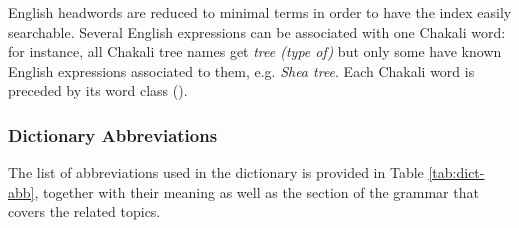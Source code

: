 \begin{table}[h]
\caption[]{Illustration of the English-Chakali reversal 
index entry\label{tab:illu-index}}
\begin{center} 
\end{center} 
\end{table}



English  headwords are reduced to 
minimal terms in order to have the index easily searchable. 
Several English expressions can be associated with one Chakali word: for 
instance, 
all Chakali tree names get {\it tree (type of)} but only some have known 
English expressions associated to  them, e.g. {\it Shea tree}. Each Chakali 
word is preceded by its
word class (). 


\subsubsection{Dictionary Abbreviations}
\label{LEX:abbrev}

The list of abbreviations used in the dictionary is provided in Table 
\ref{tab:dict-abb}, together with their meaning as well as  the section of the 
grammar that covers the related topics. 



